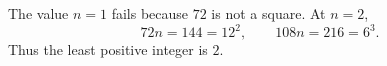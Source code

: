 The value $n=1$ fails because $72$ is not a square. At $n=2$,
\[
72n=144=12^2,\qquad108n=216=6^3.
\]
Thus the least positive integer is $\boxed2$.
